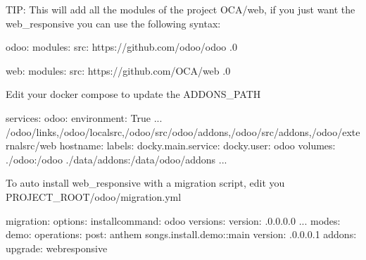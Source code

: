 \documentclass[letterpaper,10pt,english]{sphinxmanual}
\begin{document}
TIP: This will add all the modules of the project OCA/web, if you just want the web\_responsive you can use the following syntax:

%
\begin{sphinxVerbatim}[commandchars=\\\{\}]
odoo:
    modules: \PYG{o}{[}\PYG{o}{]}
    src: https://github.com/odoo/odoo .0

web:
    modules: \PYG{o}{[}\PYG{o}{]}
    src: https://github.com/OCA/web .0
\end{sphinxVerbatim}
\sphinxresetverbatimhllines

Edit your docker compose to update the ADDONS\_PATH

%
\begin{sphinxVerbatim}[commandchars=\\\{\}]
services:
  odoo:
    environment:
      \PYGZhy{} True
      \PYGZhy{} 
      \PYG{o}{[}...\PYG{o}{]}
      \PYGZhy{} 
      \PYGZhy{} 
      \PYGZhy{} 
      \PYGZhy{} 
      \PYGZhy{} 
      \PYGZhy{} /odoo/links,/odoo/local\PYGZhy{}src,/odoo/src/odoo/addons,/odoo/src/addons,/odoo/external\PYGZhy{}src/web
    hostname: \PYGZhy{}
    labels:
      docky.main.service: 
      docky.user: odoo
    volumes:
      \PYGZhy{} ./odoo:/odoo
      \PYGZhy{} ./data/addons:/data/odoo/addons
      \PYG{o}{[}...\PYG{o}{]}
\end{sphinxVerbatim}
\sphinxresetverbatimhllines

To auto install web\_responsive with a migration script, edit you PROJECT\_ROOT/odoo/migration.yml

%
\begin{sphinxVerbatim}[commandchars=\\\{\}]
migration:
  options:
    install\PYGZus{}command: odoo
  versions:
    \PYGZhy{} version: .0.0.0.0
      \PYG{o}{[}...\PYG{o}{]}
      modes:
        demo:
          operations:
            post:
              \PYGZhy{} anthem songs.install.demo::main
    \PYGZhy{} version: .0.0.0.1
      addons:
        upgrade:
          \PYGZhy{} web\PYGZus{}responsive
\end{sphinxVerbatim}
\sphinxresetverbatimhllines
\end{document}
